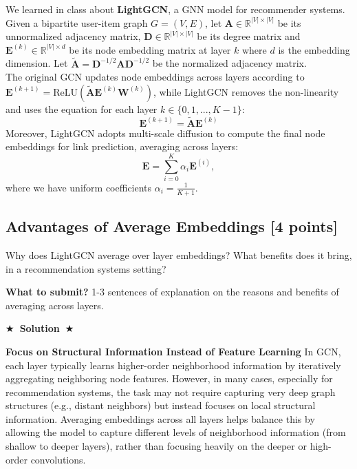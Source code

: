 \documentclass[11pt]{article}
\newcommand{\Solution}[1]{{\medskip \color{red} \bf $\bigstar$~\sf \textbf{Solution}~$\bigstar$ \sf #1 } \bigskip}
\begin{document}
We learned in class about \textbf{LightGCN}, a GNN model for recommender systems. Given a bipartite user-item graph $G = (V, E)$, let $\mathbf{A} \in \mathbb{R}^{|V| \times |V|}$ be its unnormalized adjacency matrix, $\mathbf{D} \in \mathbb{R}^{|V| \times |V|}$ be its degree matrix and $\mathbf{E}^{(k)} \in \mathbb{R}^{|V| \times d}$ be its node embedding matrix at layer $k$ where $d$ is the embedding dimension. Let $\tilde{\mathbf{A}} = \mathbf{D}^{-1/2} \mathbf{A} \mathbf{D}^{-1/2}$ be the normalized adjacency matrix.\\

\noindent The original GCN updates node embeddings across layers according to $\mathbf{E}^{(k+1)} = \text{ReLU}(\tilde{\mathbf{A}} \mathbf{E}^{(k)} \mathbf{W}^{(k)})$, while LightGCN removes the non-linearity and uses the equation for each layer $k\in \{0, 1, ..., K-1\}$:
\begin{equation}
    \mathbf{E}^{(k+1)} = \tilde{\mathbf{A}} \mathbf{E}^{(k)}
\end{equation}
Moreover, LightGCN adopts multi-scale diffusion to compute the final node embeddings for link prediction, averaging across layers:
\begin{equation}\label{eq:lightgcn-diff}
    \mathbf{E} = \sum_{i=0}^{K} \alpha_{i} \mathbf{E}^{(i)},
\end{equation}
where we have uniform coefficients $\alpha_{i} = \frac{1}{K + 1}$.


\subsection{Advantages of Average Embeddings [4 points]}
    Why does LightGCN average over layer embeddings? What benefits does it bring, in a recommendation systems setting?

    \textbf{What to submit?} 1-3 sentences of explanation on the reasons and benefits of averaging across layers.

    \Solution{}

\textbf{Focus on Structural Information Instead of Feature Learning}
In GCN, each layer typically learns higher-order neighborhood information by iteratively aggregating neighboring node features. However, in many cases, especially for recommendation systems, the task may not require capturing very deep graph structures (e.g., distant neighbors) but instead focuses on local structural information. Averaging embeddings across all layers helps balance this by allowing the model to capture different levels of neighborhood information (from shallow to deeper layers), rather than focusing heavily on the deeper or high-order convolutions.
\end{document}
